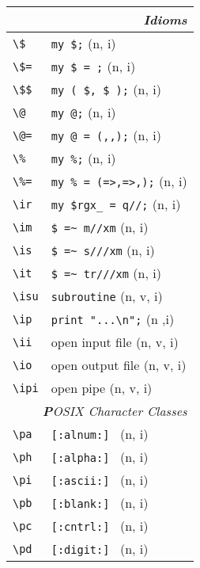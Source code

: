 \documentclass[oneside,11pt,a4paper,DIV23]{scrartcl}
\begin{document}
\begin{center}
\begin{tabular}[]{|p{10mm}|p{60mm}|}
\hline
\multicolumn{2}{|r|}{\textsl{\textbf{I}dioms}}   \\
\hline \verb'\$'   & \verb'my $;'              \hfill (n, i)\\
\hline \verb'\$='  & \verb'my $ = ;'           \hfill (n, i)\\
\hline \verb'\$$'  & \verb'my ( $, $ );'       \hfill (n, i)\\
\hline \verb'\@'   & \verb'my @;'              \hfill (n, i)\\
\hline \verb'\@='  & \verb'my @ = (,,);'       \hfill (n, i)\\
\hline \verb'\%'   & \verb'my %;'              \hfill (n, i)\\
\hline \verb'\%='  & \verb'my % = (=>,=>,);'   \hfill (n, i)\\
\hline \verb'\ir'  & \verb'my $rgx_ = q//;'    \hfill (n, i)\\
\hline \verb'\im'  & \verb'$ =~ m//xm'         \hfill (n, i)\\
\hline \verb'\is'  & \verb'$ =~ s///xm'        \hfill (n, i)\\
\hline \verb'\it'  & \verb'$ =~ tr///xm'       \hfill (n, i)\\
\hline \verb'\isu' & \verb'subroutine'         \hfill (n, v, i)\\
\hline \verb'\ip'  & \verb'print "...\n";'     \hfill (n ,i)\\
\hline \verb'\ii'  & open input file           \hfill (n, v, i)\\
\hline \verb'\io'  & open output file          \hfill (n, v, i)\\
\hline \verb'\ipi' & open pipe                 \hfill (n, v, i)\\
\hline
\hline
\multicolumn{2}{|r|}{\textsl{\textbf{P}OSIX Character Classes}} \\
\hline \verb'\pa' &  \verb'[:alnum:] '         \hfill (n, i)\\
\hline \verb'\ph' &  \verb'[:alpha:] '         \hfill (n, i)\\
\hline \verb'\pi' &  \verb'[:ascii:] '         \hfill (n, i)\\
\hline \verb'\pb' &  \verb'[:blank:] '         \hfill (n, i)\\
\hline \verb'\pc' &  \verb'[:cntrl:] '         \hfill (n, i)\\
\hline \verb'\pd' &  \verb'[:digit:] '         \hfill (n, i)\\

\end{tabular}
\end{center}
\end{document}
